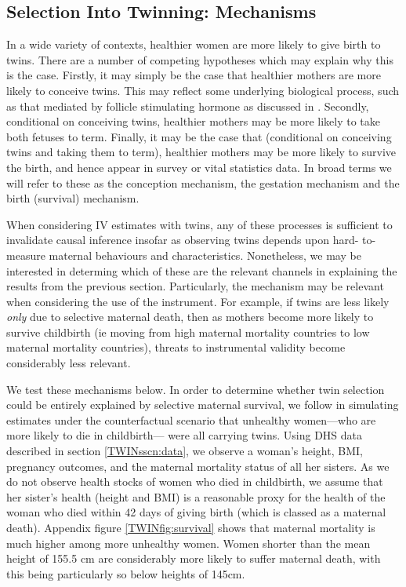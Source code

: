 \documentclass[subeqn]{article}
\begin{document}
\begin{spacing}{1.4}
\subsection{Selection Into Twinning: Mechanisms}   \label{TWINsscn:selection}
In a wide variety of contexts, healthier women are more likely to give birth to
twins.  There are a number of competing hypotheses which may explain why this is
the case.  Firstly, it may simply be the case that healthier mothers are more 
likely to conceive twins.  This may reflect some underlying biological process, 
such as that mediated by follicle stimulating hormone as discussed in 
\citet{Hall2003}.  Secondly, conditional on conceiving twins, healthier mothers 
may be more likely to take both fetuses to term.  Finally, it may be the case 
that (conditional on conceiving twins and taking them to term), healthier mothers 
may be more likely to survive the birth, and hence appear in survey or vital 
statistics data.  In broad terms we will refer to these as the conception 
mechanism, the gestation mechanism and the birth (survival) mechanism.

When considering IV estimates with twins, any of these processes is sufficient 
to invalidate causal inference insofar as observing twins depends upon hard-%
to-measure maternal behaviours and characteristics.  Nonetheless, we may be 
interested in determing which of these are the relevant channels in explaining 
the results from the previous section.  Particularly, the mechanism may be 
relevant when considering the use of the instrument.  For example, if twins are 
less likely \emph{only} due to selective maternal death, then as mothers become 
more likely to survive childbirth (ie moving from high maternal mortality 
countries to low maternal mortality countries), threats to instrumental validity 
become considerably less relevant.

We test these mechanisms below.  In order to determine whether twin selection
could be entirely explained by selective maternal survival, we follow 
\citet{Aldermanetal2011} in simulating estimates under the counterfactual 
scenario that unhealthy women---who are more likely to die in childbirth---%
were all carrying twins. Using DHS data described in section 
\ref{TWINsscn:data}, we observe a woman's height, BMI, pregnancy outcomes, and 
the maternal mortality status of all her sisters.  As we do not observe health 
stocks of women who died in childbirth, we assume that her sister's health 
(height and BMI) is a reasonable proxy for the health of the woman who died 
within 42 days of giving birth (which is classed as a maternal death).  Appendix 
figure \ref{TWINfig:survival} shows that maternal mortality is much higher among 
more unhealthy women.  Women shorter than the mean height of 155.5 cm are 
considerably more likely to suffer maternal death, with this being particularly 
so below heights of 145cm.


\end{spacing}
\end{document}
